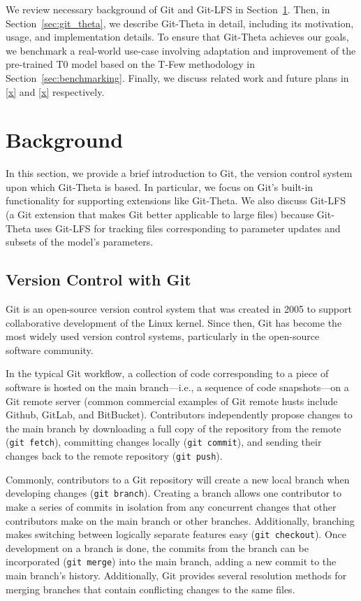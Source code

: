 \documentclass[nohyperref]{article}
\def\code#1{\texttt{#1}}
\theoremstyle{plain}
\theoremstyle{definition}
\theoremstyle{remark}
\begin{document}
We review necessary background of Git and Git-LFS in Section~\cref{sec:background}.
Then, in Section~\cref{sec:git_theta}, we describe Git-Theta in detail, including its motivation, usage, and implementation details.
To ensure that Git-Theta achieves our goals, we benchmark a real-world use-case involving adaptation and improvement of the pre-trained T0 model \citep{sanh2021multitask} based on the T-Few methodology \citep{liu2022tfew} in Section~\cref{sec:benchmarking}.
Finally, we discuss related work and future plans in \cref{x} and \cref{x} respectively.

\section{Background} \label{sec:background}

In this section, we provide a brief introduction to Git, the version control system upon which Git-Theta is based.
In particular, we focus on Git's built-in functionality for supporting extensions like Git-Theta.
We also discuss Git-LFS (a Git extension that makes Git better applicable to large files) because Git-Theta uses Git-LFS for tracking files corresponding to parameter updates and subsets of the model's parameters.

\subsection{Version Control with Git} \label{ssec:git}

Git is an open-source version control system that was created in 2005 to support collaborative development of the Linux kernel. Since then, Git has become the most widely used version control systems, particularly in the open-source software community.

In the typical Git workflow, a collection of code corresponding to a piece of software is hosted on the main branch---i.e., a sequence of code snapshots---on a Git remote server (common commercial examples of Git remote husts include Github, GitLab, and BitBucket).
Contributors independently propose changes to the main branch by downloading a full copy of the repository from the remote (\code{git fetch}), committing changes locally (\code{git commit}), and sending their changes back to the remote repository (\code{git push}).

Commonly, contributors to a Git repository will create a new local branch when developing changes (\code{git branch}). Creating a branch allows one contributor to make a series of commits in isolation from any concurrent changes that other contributors make on the main branch or other branches. Additionally, branching makes switching between logically separate features easy (\code{git checkout}). Once development on a branch is done, the commits from the branch can be incorporated (\code{git merge}) into the main branch, adding a new commit to the main branch's history. Additionally, Git provides several resolution methods for merging branches that contain conflicting changes to the same files. 
\end{document}
